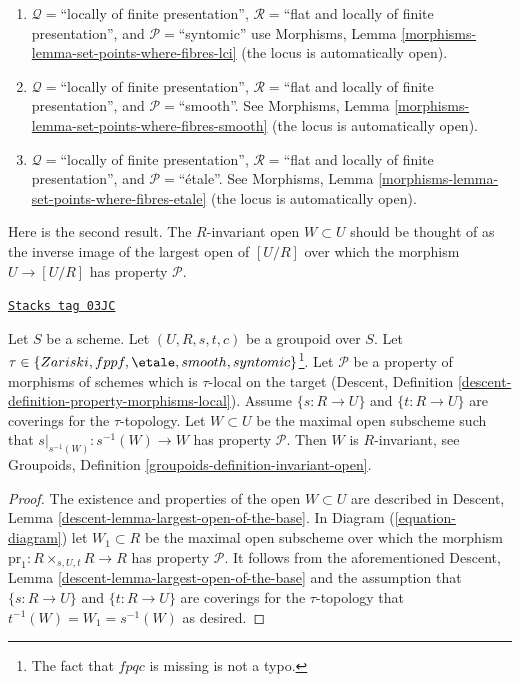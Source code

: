 \begin{remark}
\begin{enumerate}
\ref{more-morphisms-lemma-flat-finite-presentation-CM-open}.
\item[(6)] $\mathcal{Q} =$``locally of finite presentation'',
$\mathcal{R} =$``flat and locally of finite presentation'', and
$\mathcal{P}=$``syntomic'' use
Morphisms, Lemma \ref{morphisms-lemma-set-points-where-fibres-lci}
(the locus is automatically open).
\item[(7)] $\mathcal{Q} =$``locally of finite presentation'',
$\mathcal{R} =$``flat and locally of finite presentation'', and
$\mathcal{P}=$``smooth''. See
Morphisms, Lemma \ref{morphisms-lemma-set-points-where-fibres-smooth}
(the locus is automatically open).
\item[(8)] $\mathcal{Q} =$``locally of finite presentation'',
$\mathcal{R} =$``flat and locally of finite presentation'', and
$\mathcal{P}=$``\'etale''. See
Morphisms, Lemma \ref{morphisms-lemma-set-points-where-fibres-etale}
(the locus is automatically open).
\end{enumerate}
\end{remark}

Here is the second result. The $R$-invariant open $W \subset U$ should be
thought of as the inverse image of the largest open of $[U/R]$ over which
the morphism $U \to [U/R]$ has property $\mathcal{P}$.

\begin{lemma}
\label{more-groupoids-lemma-property-invariant}
\href{https://stacks.math.columbia.edu/tag/03JC}{\texttt{Stacks tag 03JC}}

Let $S$ be a scheme.
Let $(U, R, s, t, c)$ be a groupoid over $S$.
Let $\tau \in \{Zariski, \linebreak[0] fppf,
\linebreak[0] \etale, \linebreak[0]
smooth, \linebreak[0] syntomic\}$\footnote{The fact that $fpqc$ is missing
is not a typo.}. Let $\mathcal{P}$ be a property of morphisms of schemes
which is $\tau$-local on the target
(Descent, Definition \ref{descent-definition-property-morphisms-local}).
Assume $\{s : R \to U\}$ and $\{t : R \to U\}$ are coverings for the
$\tau$-topology. Let $W \subset U$ be the maximal open subscheme such that
$s|_{s^{-1}(W)} : s^{-1}(W) \to W$ has property $\mathcal{P}$.
Then $W$ is $R$-invariant, see
Groupoids, Definition \ref{groupoids-definition-invariant-open}.
\end{lemma}

\begin{proof}
The existence and properties of the open $W \subset U$ are described in
Descent, Lemma \ref{descent-lemma-largest-open-of-the-base}.
In
Diagram (\ref{equation-diagram})
let $W_1 \subset R$ be the maximal open subscheme over which the morphism
$\text{pr}_1 : R \times_{s, U, t} R \to R$ has property $\mathcal{P}$.
It follows from the aforementioned
Descent, Lemma \ref{descent-lemma-largest-open-of-the-base}
and the assumption that $\{s : R \to U\}$ and $\{t : R \to U\}$ are coverings
for the $\tau$-topology that $t^{-1}(W) = W_1 = s^{-1}(W)$ as desired.
\end{proof}

